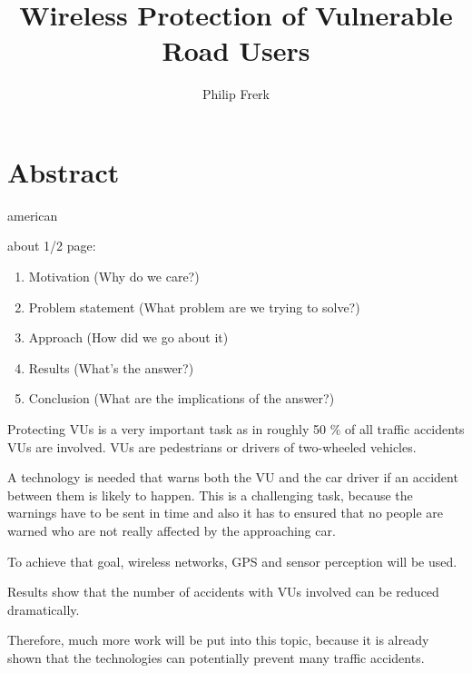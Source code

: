 \documentclass[]{ccs-thesis}
\author{Philip Frerk}
\title{Wireless Protection of Vulnerable Road Users}
\begin{document}

\maketitle

\chapter*{Abstract}
\begin{otherlanguage*}{american}

about 1/2 page:
\begin{enumerate}
	\item Motivation (Why do we care?)
	\item Problem statement (What problem are we trying to solve?)
	\item Approach (How did we go about it)
	\item Results (What's the answer?)
	\item Conclusion (What are the implications of the answer?)
\end{enumerate}

Protecting \acp{VU} is a very important task as in roughly 50 \% of all traffic accidents \acp{VU} are involved. \acp{VU} are pedestrians or drivers of two-wheeled vehicles.

A technology is needed that warns both the \ac{VU} and the car driver if an accident between them is likely to happen.  This is a challenging task, because the warnings have to be sent in time  and also it has to ensured that no people are warned who are not really affected by the approaching car.

To achieve that goal, wireless networks, GPS and sensor perception will be used.

Results show that the number of accidents with \acp{VU} involved can be reduced dramatically.

Therefore, much more work will be put into this topic, because it is already shown that the technologies can potentially prevent many traffic accidents.

\end{otherlanguage*}
\end{document}
